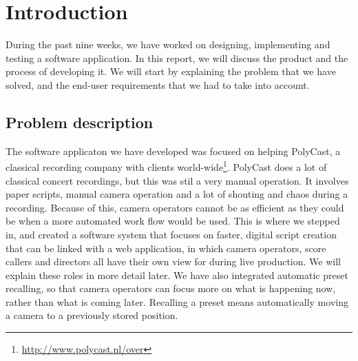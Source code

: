 \section{Introduction}

During the past nine weeks, we have worked on designing, implementing and testing a software application. In this report, we will discuss the product and the process of developing it. We will start by explaining the problem that we have solved, and the end-user requirements that we had to take into account.

\subsection{Problem description}
The software applicaton we have developed was focused on helping PolyCast, a classical recording company with clients world-wide\footnote{\url{http://www.polycast.nl/over}}. PolyCast does a lot of classical concert recordings, but this was stil a very manual operation. It involves paper scripts, manual camera operation and a lot of shouting and chaos during a recording. Because of this, camera operators cannot be as efficient as they could be when a more automated work flow would be used. This is where we stepped in, and created a software system that focuses on faster, digital script creation that can be linked with a web application, in which camera operators, score callers and directors all have their own view for during live production. We will explain these roles in more detail later. We have also integrated automatic preset recalling, so that camera operators can focus more on what is happening now, rather than what is coming later. Recalling a preset means automatically moving a camera to a previously stored position.


